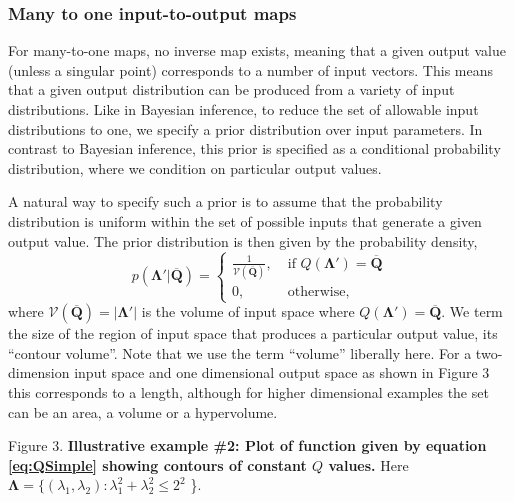 \documentclass[10pt,letterpaper]{article}
\begin{document}
\subsubsection{Many to one input-to-output maps}
\label{sec:many-2-one}
For many-to-one maps, no inverse map exists, meaning that a given output value (unless a singular point) corresponds to a number of input vectors. This means that a given output distribution can be produced from a variety of input distributions. Like in Bayesian inference, to reduce the set of allowable input distributions to one, we specify a prior distribution over input parameters. In contrast to Bayesian inference, this prior is specified as a conditional probability distribution, where we condition on particular output values.

A natural way to specify such a prior is to assume that the probability distribution is uniform within the set of possible inputs that generate a given output value. The prior distribution is then given by the probability density,
%
\begin{equation}\label{eq:priorDef}
p(\boldsymbol{\Lambda}'|\overline{\boldsymbol{Q}})=
\begin{cases}
\frac{1}{\mathcal{V}(\overline{\boldsymbol{Q}})}, \; & \text{if } Q(\boldsymbol{\Lambda}')=\overline{\boldsymbol{Q}} \\
0,                                                & \text{otherwise},
\end{cases}
\end{equation}
%
where $\mathcal{V}(\overline{\boldsymbol{Q}}) = |\boldsymbol{\Lambda}'|$ is the volume of input space where $Q(\boldsymbol{\Lambda}')=\overline{\boldsymbol{Q}}$. We term the size of the region of input space that produces a particular output value, its ``contour volume''. Note that we use the term ``volume'' liberally here. For a two-dimension input space and one dimensional output space as shown in Figure 3 this corresponds to a length, although for higher dimensional examples the set can be an area, a volume or a hypervolume.

\vspace{0.5cm}

Figure 3. \textbf{Illustrative example \#2: Plot of function given by equation \eqref{eq:QSimple} showing contours of constant $Q$ values.}
Here $\boldsymbol{\Lambda} = \{ (\lambda_1,\lambda_2): \lambda_1^2+\lambda_2^2\leq2^2$ \}.
\end{document}
